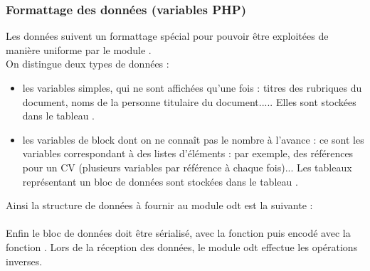 \subsubsection{Formattage des données (variables PHP)}

Les données suivent un formattage spécial pour pouvoir être exploitées de manière uniforme par le module \odt. \\
On distingue deux types de données : 
\begin{itemize}
 \item les variables simples, qui ne sont affichées qu'une fois : titres des rubriques du document, noms de la personne titulaire du document..... Elles sont stockées dans le tableau .
 \item les variables de block dont on ne connaît pas le nombre à l'avance : ce sont les variables correspondant à des listes d'éléments : par exemple, des références pour un CV (plusieurs variables par référence à chaque fois)... Les tableaux représentant un bloc de données sont stockées dans le tableau .
\end{itemize}

Ainsi la structure de données à fournir au module odt est la suivante : \\
\\

Enfin le bloc de données doit être sérialisé, avec la fonction  puis encodé avec la fonction . Lors de la réception des données, le module odt effectue les opérations inverses.  \\



